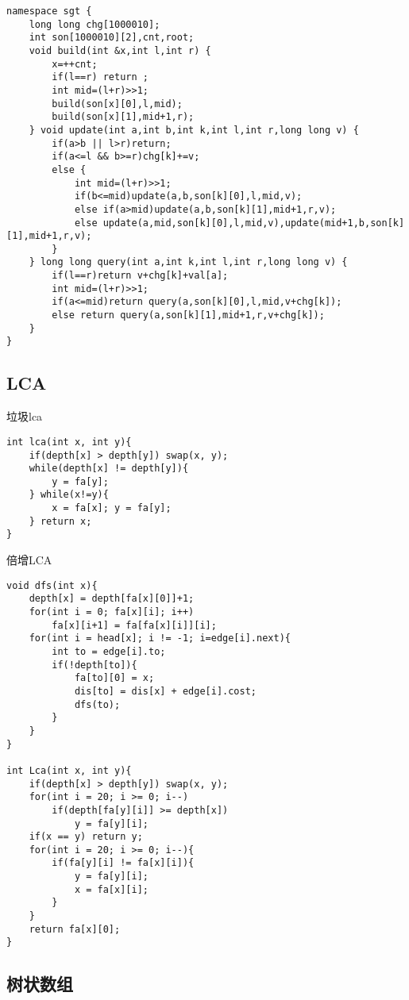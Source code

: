 \begin{lstlisting}
namespace sgt {
    long long chg[1000010];
    int son[1000010][2],cnt,root;
    void build(int &x,int l,int r) {
        x=++cnt;
        if(l==r) return ;
        int mid=(l+r)>>1;
        build(son[x][0],l,mid);
        build(son[x][1],mid+1,r);
    } void update(int a,int b,int k,int l,int r,long long v) {
        if(a>b || l>r)return;
        if(a<=l && b>=r)chg[k]+=v;
        else {
            int mid=(l+r)>>1;
            if(b<=mid)update(a,b,son[k][0],l,mid,v);
            else if(a>mid)update(a,b,son[k][1],mid+1,r,v);
            else update(a,mid,son[k][0],l,mid,v),update(mid+1,b,son[k][1],mid+1,r,v);
        }
    } long long query(int a,int k,int l,int r,long long v) {
        if(l==r)return v+chg[k]+val[a];
        int mid=(l+r)>>1;
        if(a<=mid)return query(a,son[k][0],l,mid,v+chg[k]);
        else return query(a,son[k][1],mid+1,r,v+chg[k]);
    }
}
\end{lstlisting}


\subsection{LCA}
垃圾lca
\begin{lstlisting}
int lca(int x, int y){
    if(depth[x] > depth[y]) swap(x, y);
    while(depth[x] != depth[y]){
        y = fa[y];
    } while(x!=y){
        x = fa[x]; y = fa[y];
    } return x;
}
\end{lstlisting}

倍增LCA
\begin{lstlisting}
void dfs(int x){
    depth[x] = depth[fa[x][0]]+1;
    for(int i = 0; fa[x][i]; i++) 
        fa[x][i+1] = fa[fa[x][i]][i];
    for(int i = head[x]; i != -1; i=edge[i].next){
        int to = edge[i].to;
        if(!depth[to]){
            fa[to][0] = x;
            dis[to] = dis[x] + edge[i].cost;
            dfs(to);
        }
    }
}

int Lca(int x, int y){
    if(depth[x] > depth[y]) swap(x, y);
    for(int i = 20; i >= 0; i--)
        if(depth[fa[y][i]] >= depth[x])
            y = fa[y][i];
    if(x == y) return y;
    for(int i = 20; i >= 0; i--){
        if(fa[y][i] != fa[x][i]){
            y = fa[y][i];
            x = fa[x][i];
        }
    }
    return fa[x][0];
}
\end{lstlisting}


\subsection{树状数组}

